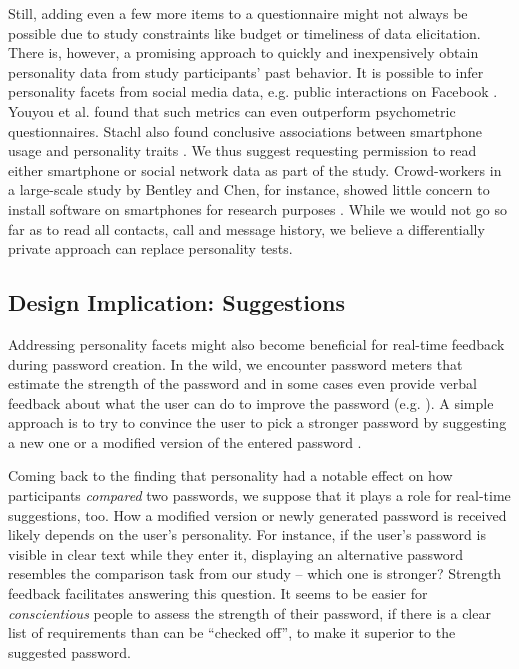 Still, adding even a few more items to a questionnaire might not always be possible due to study constraints like budget or timeliness of data elicitation. There is, however, a promising approach to quickly and inexpensively obtain personality data from study participants' past behavior. It is possible to infer personality facets from social media data, e.g. public interactions on Facebook \cite{Youyou2015Personality}. Youyou et al. found that such metrics can even outperform psychometric questionnaires. Stachl \etal also found conclusive associations between smartphone usage and personality traits \cite{Stachl2017PersonalitySmartphones}. We thus suggest requesting permission to read either smartphone or social network data as part of the study. Crowd-workers in a large-scale study by Bentley and Chen, for instance, showed little concern to install software on smartphones for research purposes \cite{Bentley2015Phonebook}. While we would not go so far as to read all contacts, call and message history, we believe a differentially private approach can replace personality tests. 

\subsection{Design Implication: Suggestions}
Addressing personality facets might also become beneficial for real-time feedback during password creation. In the wild, we encounter password meters that estimate the strength of the password and in some cases even provide verbal feedback about what the user can do to improve the password (e.g. \cite{Wheeler2016zxcvbn}). A simple approach is to try to convince the user to pick a stronger password by suggesting a new one or a modified version of the entered password \cite{Forget2008ImprovingPasswordsThroughPersuasion, Seitz2016SuggestionsDecoy, Shay2015SpoonfulOfSugar}. 

Coming back to the finding that personality had a notable effect on how participants \textit{compared} two passwords, we suppose that it plays a role for real-time suggestions, too. How a modified version or newly generated password is received likely depends on the user's personality. For instance, if the user's password is visible in clear text while they enter it, displaying an alternative password resembles the comparison task from our study -- which one is stronger? Strength feedback facilitates answering this question. It seems to be easier for \textit{conscientious} people to assess the strength of their password, if there is a clear list of requirements than can be ``checked off'', to make it superior to the suggested password. 

